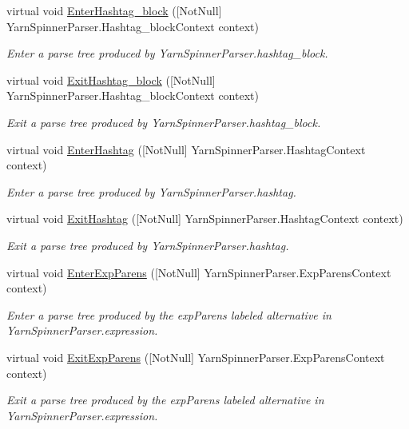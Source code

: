 \begin{DoxyCompactItemize}
virtual void \hyperlink{a00196_a9ff2355e87f3be1cf750074e9298c3ae}{Enter\-Hashtag\-\_\-block} (\mbox{[}Not\-Null\mbox{]} Yarn\-Spinner\-Parser.\-Hashtag\-\_\-block\-Context context)
\begin{DoxyCompactList}\small\item\em Enter a parse tree produced by Yarn\-Spinner\-Parser.\-hashtag\-\_\-block. \end{DoxyCompactList}\item 
virtual void \hyperlink{a00196_a7fec59b76bdec57fbc3dba0cf0977748}{Exit\-Hashtag\-\_\-block} (\mbox{[}Not\-Null\mbox{]} Yarn\-Spinner\-Parser.\-Hashtag\-\_\-block\-Context context)
\begin{DoxyCompactList}\small\item\em Exit a parse tree produced by Yarn\-Spinner\-Parser.\-hashtag\-\_\-block. \end{DoxyCompactList}\item 
virtual void \hyperlink{a00196_a0643d47b57d60c3d17fea2e1a883d63c}{Enter\-Hashtag} (\mbox{[}Not\-Null\mbox{]} Yarn\-Spinner\-Parser.\-Hashtag\-Context context)
\begin{DoxyCompactList}\small\item\em Enter a parse tree produced by Yarn\-Spinner\-Parser.\-hashtag. \end{DoxyCompactList}\item 
virtual void \hyperlink{a00196_a7eb067a011e0ba441779489495424912}{Exit\-Hashtag} (\mbox{[}Not\-Null\mbox{]} Yarn\-Spinner\-Parser.\-Hashtag\-Context context)
\begin{DoxyCompactList}\small\item\em Exit a parse tree produced by Yarn\-Spinner\-Parser.\-hashtag. \end{DoxyCompactList}\item 
virtual void \hyperlink{a00196_a550723908043bb1c5f6e85542710dd8f}{Enter\-Exp\-Parens} (\mbox{[}Not\-Null\mbox{]} Yarn\-Spinner\-Parser.\-Exp\-Parens\-Context context)
\begin{DoxyCompactList}\small\item\em Enter a parse tree produced by the {\ttfamily exp\-Parens} labeled alternative in Yarn\-Spinner\-Parser.\-expression. \end{DoxyCompactList}\item 
virtual void \hyperlink{a00196_a8e9b149b4b21ac11f38b77ca5eb39df3}{Exit\-Exp\-Parens} (\mbox{[}Not\-Null\mbox{]} Yarn\-Spinner\-Parser.\-Exp\-Parens\-Context context)
\begin{DoxyCompactList}\small\item\em Exit a parse tree produced by the {\ttfamily exp\-Parens} labeled alternative in Yarn\-Spinner\-Parser.\-expression. \end{DoxyCompactList}\item 

\end{DoxyCompactItemize}
